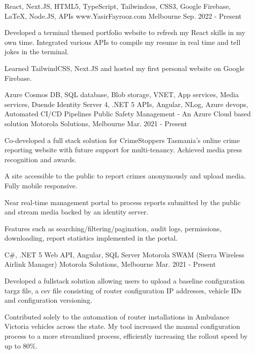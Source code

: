 

\begin{cventries}
  \cventry
    {React, Next.JS, HTML5, TypeScript, Tailwindcss, CSS3, Google Firebase, LaTeX, Node.JS, APIs }
    {www.YasirFayrooz.com}
    {Melbourne}
    {Sep. 2022 - Present}
    {
      \begin{cvitems}
        \item {Developed a terminal themed portfolio website to refresh my React skills in my own time. Integrated various APIs to compile my resume in real time and tell jokes in the terminal.}
        \item {Learned TailwindCSS, Next.JS and hosted my first personal website on Google Firebase.}
      \end{cvitems}
    }
  \cventry
    {Azure Cosmos DB, SQL database, Blob storage, VNET, App services, Media services, Duende Identity Server 4, .NET 5 APIs, Angular, NLog, Azure devops, Automated CI/CD Pipelines}
    {Public Safety Management - An Azure Cloud based solution}
    {Motorola Solutions, Melbourne}
    {Mar. 2021 - Present}
    {
      \begin{cvitems}
        \item {Co-developed a full stack solution for CrimeStoppers Tasmania's online crime reporting website with future support for multi-tenancy. Achieved media press recognition and awards.}
        \item {A site accessible to the public to report crimes anonymously and upload media. Fully mobile responsive.}
        \item {Near real-time management portal to process reports submitted by the public and stream media backed by an identity server.}
        \item {Features such as searching/filtering/pagination, audit logs, permissions, downloading, report statistics implemented in the portal.}
      \end{cvitems}
    }
  \cventry
    {C\#, .NET 5 Web API, Angular, SQL Server}
    {Motorola SWAM (Sierra Wireless Airlink Manager)}
    {Motorola Solutions, Melbourne}
    {Mar. 2021 - Present}
    {
      \begin{cvitems}
        \item {Developed a fullstack solution allowing users to upload a baseline configuration targz file, a csv file consisting of router configuration IP addresses, vehicle IDs and configuration versioning.}
        \item {Contributed solely to the automation of router installations in Ambulance Victoria vehicles across the state. My tool increased the manual configuration process to a more streamlined process, efficiently increasing the rollout speed by up to 80\%.}

\end{cvitems}}
\end{cventries}
